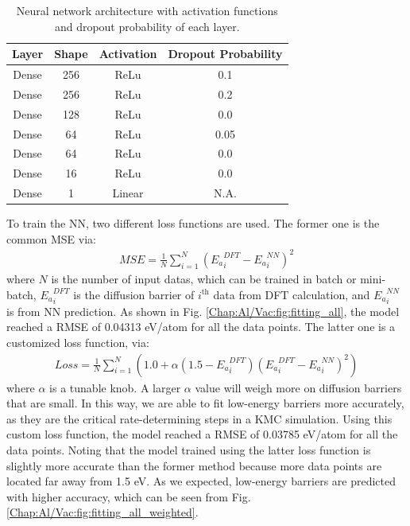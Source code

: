 \begin{table}[!htbp]
\centering
\caption[Neural network architecture with activation functions and dropout probability of each layer.]{Neural network architecture with activation functions and dropout probability of each layer.}
\label{Chap:Al/Vac:tab:NN}
\begin{tabular}{cccc}
\\
\hline
\hline
Layer & Shape  & Activation  & Dropout Probability\\ 
\hline
Dense & 256    & ReLu       & 0.1                 \\
Dense & 256    & ReLu       & 0.2                 \\
Dense & 128    & ReLu       & 0.0                 \\
Dense & 64     & ReLu       & 0.05                \\
Dense & 64     & ReLu       & 0.0                 \\
Dense & 16     & ReLu       & 0.0                 \\
Dense & 1      & Linear     & N.A.                \\ 
\hline
\hline
\end{tabular}
\end{table}


To train the \ac{NN}, two different loss functions are used. The former one is the common \acf{MSE} via:
\begin{subequations}
\begin{align}
MSE = \frac{1}{N}\sum_{i=1}^{N}({E_a}_{i}^{DFT} - {E_a}_{i}^{NN})^2
\label{Chap:Al/Vac:eq:MSE}
\end{align}
\end{subequations}
where $N$ is the number of input datas, which can be trained in batch or mini-batch, ${E_a}_i^{DFT}$ is the diffusion barrier of $i^{\text{th}}$ data from \ac{DFT} calculation, and ${E_a}_{i}^{NN}$ is from \ac{NN} prediction. As shown in Fig. \ref{Chap:Al/Vac:fig:fitting_all}, the model reached a \ac{RMSE} of 0.04313 eV/atom for all the data points. The latter one is a customized loss function, via:
\begin{subequations}
\begin{align}
Loss = \frac{1}{N}\sum_{i=1}^{N}{(1.0 + \alpha (1.5 - {E_a}_{i}^{DFT})({E_a}_{i}^{DFT} - {E_a}_{i}^{NN})^2)}
\label{Chap:Al/Vac:eq:custLoss}
\end{align}
\end{subequations}
where $\alpha$ is a tunable knob. A larger $\alpha$ value will weigh more on diffusion barriers that are small. In this way, we are able to fit low-energy barriers more accurately, as they are the critical rate-determining steps in a \ac{KMC} simulation. Using this custom loss function, the model reached a \ac{RMSE} of 0.03785 eV/atom for all the data points. Noting that the model trained using the latter loss function is slightly more accurate than the former method because more data points are located far away from 1.5 eV. As we expected, low-energy barriers are predicted with higher accuracy, which can be seen from Fig. \ref{Chap:Al/Vac:fig:fitting_all_weighted}.


